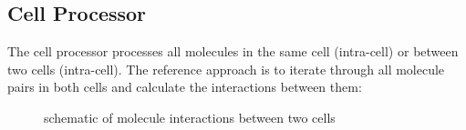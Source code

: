 \subsection{Cell Processor}
The cell processor processes all molecules in the same cell (intra-cell) or between two cells (intra-cell).
The reference approach is to iterate through all molecule pairs in both cells and calculate the interactions between them:
\begin{figure}
  \centering
  \caption{schematic of molecule interactions between two cells}
\end{figure}

